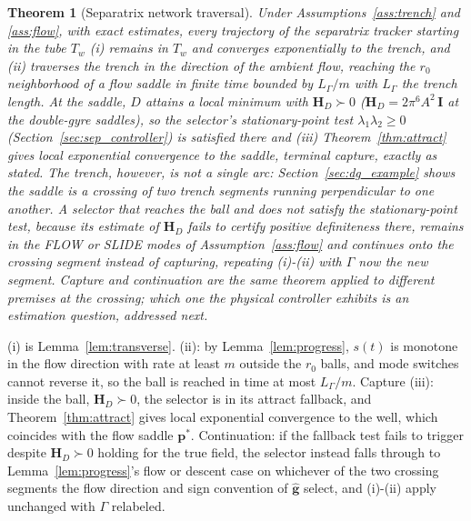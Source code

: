 \documentclass[lettersize,journal]{IEEEtran}
\newtheorem{theorem}{Theorem}
\begin{document}
\begin{theorem}[Separatrix network traversal]
\label{thm:separatrix}
Under Assumptions~\ref{ass:trench} and \ref{ass:flow}, with exact
estimates, every trajectory of the separatrix tracker starting in the
tube $T_w$
(i) remains in $T_w$ and converges exponentially to the trench, and (ii)
traverses the trench in the direction of the ambient flow, reaching the
$r_0$ neighborhood of a flow saddle in finite time bounded by
$L_\Gamma/m$ with $L_\Gamma$ the trench length. At the saddle, $D$
attains a local minimum with $\mathbf{H}_D \succ 0$
($\mathbf{H}_D = 2\pi^6 A^2\,\mathbf{I}$ at the double-gyre saddles), so
the selector's stationary-point test $\lambda_1\lambda_2 \geq 0$
(Section~\ref{sec:sep_controller}) is satisfied there and (iii)
Theorem~\ref{thm:attract} gives local exponential convergence to the
saddle, terminal capture, exactly as stated. The trench, however, is not
a single arc: Section~\ref{sec:dg_example} shows the saddle is a
crossing of two trench segments running perpendicular to one another. A
selector that reaches the ball and does not satisfy the stationary-point
test, because its estimate of $\mathbf{H}_D$ fails to certify positive
definiteness there, remains in the FLOW or SLIDE modes of
Assumption~\ref{ass:flow} and continues onto the crossing segment
instead of capturing, repeating (i)-(ii) with $\Gamma$ now the new
segment. Capture and continuation are the same theorem applied to
different premises at the crossing; which one the physical controller
exhibits is an estimation question, addressed next.
\end{theorem}

\begin{IEEEproof}
(i) is Lemma~\ref{lem:transverse}. (ii): by Lemma~\ref{lem:progress},
$s(t)$ is monotone in the flow direction with rate at least $m$ outside
the $r_0$ balls, and mode switches cannot reverse it, so the ball is
reached in time at most $L_\Gamma/m$. Capture (iii): inside the ball,
$\mathbf{H}_D \succ 0$, the selector is in its attract fallback, and
Theorem~\ref{thm:attract} gives local exponential convergence to the
well, which coincides with the flow saddle $\mathbf{p}^*$. Continuation:
if the fallback test fails to trigger despite $\mathbf{H}_D \succ 0$
holding for the true field, the selector instead falls through to
Lemma~\ref{lem:progress}'s flow or descent case on whichever of the two
crossing segments the flow direction and sign convention of
$\hat{\mathbf{g}}$ select, and (i)-(ii) apply unchanged with $\Gamma$
relabeled.
\end{IEEEproof}
\end{document}
